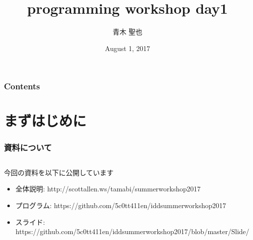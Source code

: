 \documentclass[10pt, dvipdfmx]{beamer}
\title{programming workshop day1}
\author{青木 聖也}
\institute[所属]{多摩美術大学情報デザイン研究室}
\date{August 1, 2017}
\begin{document}
    \begin{frame}[plain]
        \frametitle{}
	    \titlepage
    \end{frame}

    \begin{frame}
        \frametitle{Contents}
        \tableofcontents
    \end{frame}

    \section{まずはじめに}
        \begin{frame}
            \frametitle{資料について}
            \begin{columns}[c]
                \begin{column}{0.80\textwidth}
                    \begin{block}{今回の資料を以下に公開しています}
                        \begin{itemize}
                            \scriptsize
                            \item 全体説明: http://scottallen.ws/tamabi/summerworkshop2017
                            \item プログラム: https://github.com/5c0tt411en/iddsummerworkshop2017
                            \item スライド: https://github.com/5c0tt411en/iddsummerworkshop2017/blob/master/Slide/
                        \end{itemize}
                    \end{block}
                \end{column}
            \end{columns}
        \end{frame}

        \begin{frame}
        \end{frame}
\end{document}
